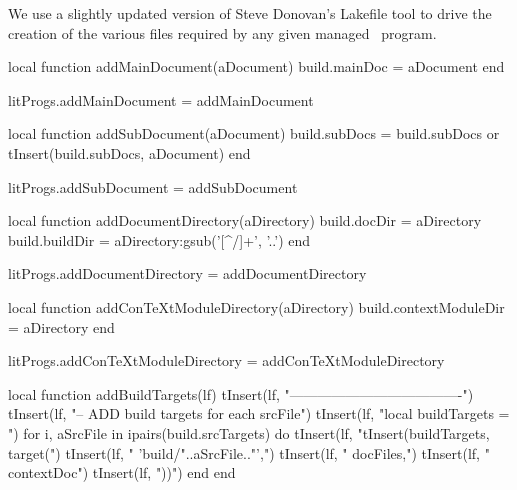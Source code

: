 
\startchapter[title=Lakefile]

We use a slightly updated version of Steve Donovan's Lakefile tool to 
drive the creation of the various files required by any given 
 managed \ConTeXt\ program. 

\startMkIVCode
\def\addMainDocument#1{
  \directlua{
    thirddata.literateProgs.addMainDocument('#1')
  }
}

\def\addSubDocument#1{
  \directlua{
    thirddata.literateProgs.addSubDocument('#1')
  }
}

\def\addDocumentDirectory#1{
  \directlua{
    thirddata.literateProgs.addDocumentDirectory('#1')
  }
}

\def\addConTeXtModuleDirectory#1{
  \directlua{
    thirddata.literateProgs.addConTeXtModuleDirectory('#1')
  }
}
\stopMkIVCode

\startLuaCode
local function addMainDocument(aDocument)
  build.mainDoc = aDocument
end

litProgs.addMainDocument = addMainDocument

local function addSubDocument(aDocument)
  build.subDocs = build.subDocs or { }
  tInsert(build.subDocs, aDocument)
end

litProgs.addSubDocument = addSubDocument

local function addDocumentDirectory(aDirectory)
  build.docDir   = aDirectory
  build.buildDir = aDirectory:gsub('[^/]+', '..')
end

litProgs.addDocumentDirectory = addDocumentDirectory

local function addConTeXtModuleDirectory(aDirectory)
  build.contextModuleDir = aDirectory
end

litProgs.addConTeXtModuleDirectory = addConTeXtModuleDirectory
\stopLuaCode

\startMkIVCode
\def\compileLakefile#1{
  \directlua{
    thirddata.literateProgs.compileLakefile('#1')
  }
}
\stopMkIVCode

\startLuaCode
local function addBuildTargets(lf)
  tInsert(lf, "-------------------------------------")
  tInsert(lf, "-- ADD build targets for each srcFile\n")
  tInsert(lf, "local buildTargets = {}\n")
  for i, aSrcFile in ipairs(build.srcTargets) do
    tInsert(lf, "tInsert(buildTargets, target(")
    tInsert(lf, "  'build/"..aSrcFile.."',")
    tInsert(lf, "  docFiles,")
    tInsert(lf, "  contextDoc")
    tInsert(lf, "))\n")
  end
end


